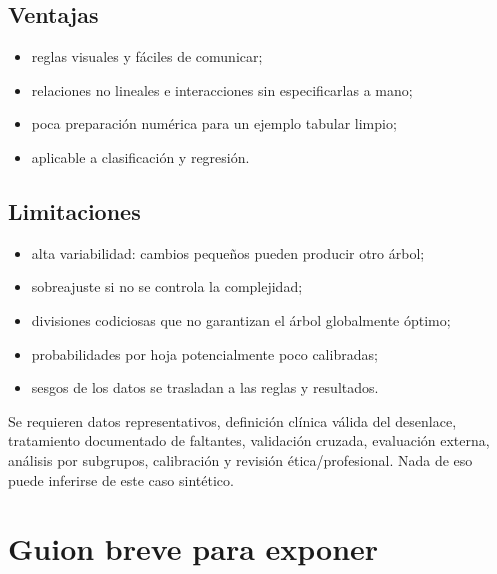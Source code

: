 \documentclass[11pt,oneside,openany]{book}
\begin{document}
\section{Ventajas}

\begin{itemize}
  \item reglas visuales y fáciles de comunicar;
  \item relaciones no lineales e interacciones sin especificarlas a mano;
  \item poca preparación numérica para un ejemplo tabular limpio;
  \item aplicable a clasificación y regresión.
\end{itemize}

\section{Limitaciones}

\begin{itemize}
  \item alta variabilidad: cambios pequeños pueden producir otro árbol;
  \item sobreajuste si no se controla la complejidad;
  \item divisiones codiciosas que no garantizan el árbol globalmente óptimo;
  \item probabilidades por hoja potencialmente poco calibradas;
  \item sesgos de los datos se trasladan a las reglas y resultados.
\end{itemize}

\begin{alerta}
Se requieren datos representativos, definición clínica válida del desenlace,
tratamiento documentado de faltantes, validación cruzada, evaluación externa,
análisis por subgrupos, calibración y revisión ética/profesional. Nada de eso
puede inferirse de este caso sintético.
\end{alerta}

\chapter{Guion breve para exponer}
\end{document}

